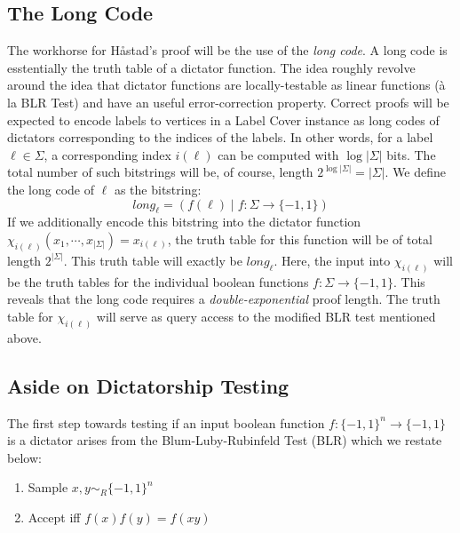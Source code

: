 \subsection{The Long Code}
The workhorse for H\aa stad's proof will be the use of the \emph{long code}. A long code is esstentially the truth table of a dictator function. The idea roughly revolve around the idea that dictator functions are locally-testable as linear functions (\`a la BLR Test) and have an useful error-correction property. Correct proofs will be expected to encode labels to vertices in a Label Cover instance as long codes of dictators corresponding to the indices of the labels. In other words, for a label $\ell \in \Sigma$, a corresponding index $i(\ell)$ can be computed with $\log{|\Sigma|}$ bits.
%
The total number of such bitstrings will be, of course, length $2^{\log{|\Sigma|}} = |\Sigma|$. We define the long code of $\ell$ as the bitstring:
%
\begin{equation}
  \mathit{long}_{\ell} = (f(\ell) \mid f:\Sigma \rightarrow \{-1,1\})
\end{equation}
%
If we additionally encode this bitstring into the dictator function $\chi_{i(\ell)}(x_1,\cdots,x_{|\Sigma|}) = x_{i(\ell)}$, the truth table for this function will be of total length $2^{|\Sigma|}$. This truth table will exactly be $\mathit{long}_{\ell}$. Here, the input into  $\chi_{i(\ell)}$ will be the truth tables for the individual boolean functions $f: \Sigma \rightarrow \{-1,1\}$.
%
This reveals that the long code requires a \emph{double-exponential} proof length. The truth table for $\chi_{i(\ell)}$ will serve as query access to the modified BLR test mentioned above.


\subsection{Aside on Dictatorship Testing}
The first step towards testing if an input boolean function $f:\{-1,1\}^n \rightarrow \{-1,1\}$ is a dictator arises from the Blum-Luby-Rubinfeld Test (BLR) which we restate below: \newline

\begin{enumerate}
  \item Sample $x,y \sim_R \{-1,1\}^n$
  \item Accept iff $f(x)f(y) = f(xy)$
\end{enumerate}


